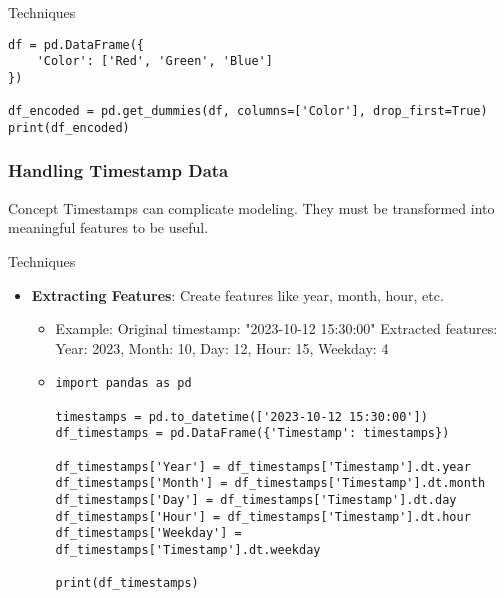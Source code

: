 \documentclass[aspectratio=169]{beamer}
\begin{document}
\begin{frame}[fragile]
\begin{block}{Techniques}
\begin{itemize}
\begin{itemize}
\begin{lstlisting}
df = pd.DataFrame({
    'Color': ['Red', 'Green', 'Blue']
})

df_encoded = pd.get_dummies(df, columns=['Color'], drop_first=True)
print(df_encoded)
                \end{lstlisting}
            \end{itemize}
        \end{itemize}
    \end{block}
\end{frame}

\begin{frame}
    \frametitle{Handling Timestamp Data}
    \begin{block}{Concept}
        Timestamps can complicate modeling. They must be transformed into meaningful features to be useful.
    \end{block}
    
    \begin{block}{Techniques}
        \begin{itemize}
            \item \textbf{Extracting Features}: Create features like year, month, hour, etc.
            \begin{itemize}
                \item Example: 
                    Original timestamp: "2023-10-12 15:30:00"
                    Extracted features: Year: 2023, Month: 10, Day: 12, Hour: 15, Weekday: 4
                \item \begin{lstlisting}
import pandas as pd

timestamps = pd.to_datetime(['2023-10-12 15:30:00'])
df_timestamps = pd.DataFrame({'Timestamp': timestamps})

df_timestamps['Year'] = df_timestamps['Timestamp'].dt.year
df_timestamps['Month'] = df_timestamps['Timestamp'].dt.month
df_timestamps['Day'] = df_timestamps['Timestamp'].dt.day
df_timestamps['Hour'] = df_timestamps['Timestamp'].dt.hour
df_timestamps['Weekday'] = df_timestamps['Timestamp'].dt.weekday

print(df_timestamps)
                \end{lstlisting}
            \end{itemize}
        \end{itemize}
    \end{block}
\end{frame}
\end{document}
